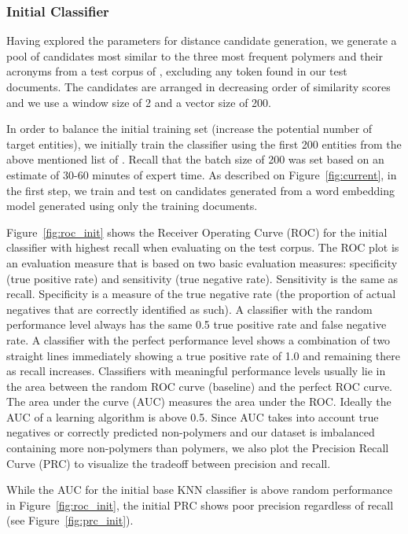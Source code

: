 \subsubsection{Initial Classifier}
Having explored the parameters for distance candidate generation, we generate a pool of  candidates most similar to the three most frequent polymers and their acronyms from a test corpus of , excluding any token found in our test documents. 
The candidates are arranged in decreasing order of similarity scores and we use a window size of 2 and a vector size of 200. 

In order to balance the initial training set (increase the potential number of target entities),
we initially train the classifier using the first
200 entities from the above mentioned list of .
Recall that the batch size of 200 was set based on an estimate of 30-60 minutes of expert time.
As described on Figure~\ref{fig:current}, in the first step, we train and test on candidates generated from a word embedding model generated using only the training documents. 

Figure~\ref{fig:roc_init} shows the Receiver Operating Curve (ROC) for the initial classifier with highest recall when evaluating on the test corpus. 
The ROC plot is an evaluation measure that is based on two basic evaluation measures: specificity (true positive rate) and sensitivity (true negative rate).
Sensitivity is the same as recall. Specificity is a measure of the true negative rate (the proportion of actual negatives that are correctly identified as such).
A classifier with the random performance level always has the same 0.5 true positive rate and false negative rate.
A classifier with the perfect performance level shows a combination of two straight lines immediately showing a true positive rate of 1.0 and remaining there as recall increases.
Classifiers with meaningful performance levels usually lie in the area between the random ROC curve (baseline) and the perfect ROC curve. 
The area under the curve (AUC) measures the area under the ROC.
Ideally the AUC of a learning algorithm is above 0.5. 
Since AUC takes into account true negatives or correctly predicted non-polymers and our dataset is imbalanced containing more non-polymers than polymers, we also plot the Precision Recall Curve (PRC) to visualize the tradeoff between precision and recall.

While the AUC for the initial base KNN classifier is above random performance in Figure~\ref{fig:roc_init}, the initial PRC shows poor precision regardless of recall (see Figure~\ref{fig:prc_init}).

